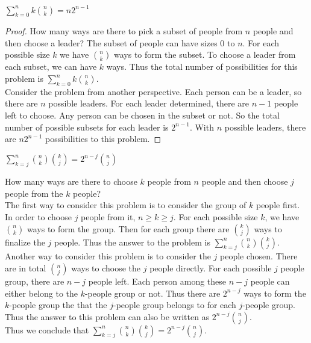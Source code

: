 \documentclass[11pt]{article}
\begin{document}
\begin{Parts}
    \Part $\sum_{k=0}^n k {n \choose k} = n2^{n-1}$

    \begin{Answer}
        \begin{proof}
            How many ways are there to pick a subset of people from $n$ people and then choose a leader? 
            The subset of people can have sizes $0$ to $n$. For each possible size $k$ we have ${n \choose k}$ 
            ways to form the subset. To choose a leader from each subset, we can have $k$ ways. Thus the 
            total number of possibilities for this problem is $\sum_{k=0}^n k{n \choose k}$. \\
            Consider the problem from another perspective. Each person can be a leader, so there are $n$ 
            possible leaders. For each leader determined, there are $n-1$ people left to choose. Any person 
            can be chosen in the subset or not. So the total number of possible subsets for each leader 
            is $2^{n-1}$. With $n$ possible leaders, there are $n2^{n-1}$ possibilities to this problem. 
        \end{proof}
    \end{Answer}

    \Part $\sum_{k=j}^n {n \choose k} {k \choose j} = 2^{n-j} {n \choose j}$ 
    
    \begin{Answer}
        How many ways are there to choose $k$ people from $n$ people and then choose $j$ people from the 
        $k$ people? \\
        The first way to consider this problem is to consider the group of $k$ people first. In order to 
        choose $j$ people from it, $n \geq k \geq j$. For each possible size $k$, we have ${n \choose k}$
        ways to form the group. Then for each group there are ${k \choose j}$ ways to finalize the $j$ 
        people. Thus the answer to the problem is $\sum_{k=j}^n{n \choose k}{k \choose j}$. \\
        Another way to consider this problem is to consider the $j$ people chosen. There are in total 
        ${n \choose j}$ ways to choose the $j$ people directly. For each possible $j$ people group, there 
        are $n - j$ people left. Each person among these $n - j$ people can either belong to the 
        $k$-people group or not. Thus there are $2^{n-j}$ ways to form the $k$-people group the 
        that the $j$-people group belongs to for each $j$-people group. Thus the answer to this 
        problem can also be written as $2^{n-j}{n \choose j}$. \\
        Thus we conclude that $\sum_{k=j}^n {n \choose k} {k \choose j} = 2^{n-j} {n \choose j}$. 
    \end{Answer}

\end{Parts}
\end{document}
